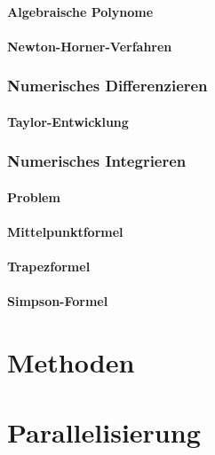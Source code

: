 \documentclass[a4paper, 12pt]{article}
\begin{document}
\subsection{Algebraische Polynome}


\subsection{Newton-Horner-Verfahren}



\section{Numerisches Differenzieren}


\subsection{Taylor-Entwicklung}



\section{Numerisches Integrieren}


\subsection{Problem}


\subsection{Mittelpunktformel}


\subsection{Trapezformel}


\subsection{Simpson-Formel}




\part{Methoden}




\part{Parallelisierung}
\end{document}

